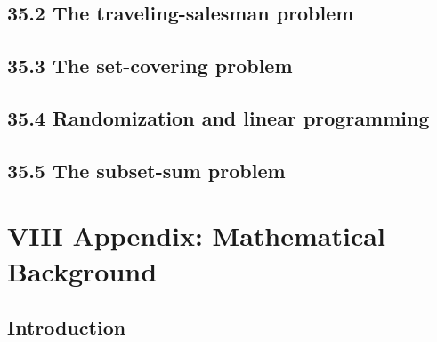 \documentclass[a4paper]{article}
\begin{document}
\subsection{35.2 The traveling-salesman problem}
\subsection{35.3 The set-covering problem}
\subsection{35.4 Randomization and linear programming}
\subsection{35.5 The subset-sum problem}

\newpage
\section*{VIII Appendix: Mathematical Background}
\subsection*{Introduction}
\end{document}
